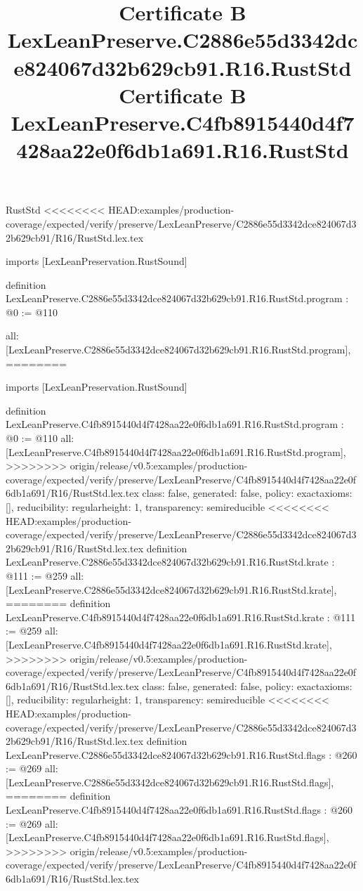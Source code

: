 \begin{lexlean}{RustStd}
<<<<<<<< HEAD:examples/production-coverage/expected/verify/preserve/LexLeanPreserve/C2886e55d3342dce824067d32b629cb91/R16/RustStd.lex.tex
\title{Certificate B LexLeanPreserve.C2886e55d3342dce824067d32b629cb91.R16.RustStd}
\begin{coremodule}
imports [LexLeanPreservation.RustSound]

definition LexLeanPreserve.C2886e55d3342dce824067d32b629cb91.R16.RustStd.program : @0 := @110 {
  all: [LexLeanPreserve.C2886e55d3342dce824067d32b629cb91.R16.RustStd.program],
========
\title{Certificate B LexLeanPreserve.C4fb8915440d4f7428aa22e0f6db1a691.R16.RustStd}
\begin{coremodule}
imports [LexLeanPreservation.RustSound]

definition LexLeanPreserve.C4fb8915440d4f7428aa22e0f6db1a691.R16.RustStd.program : @0 := @110 {
  all: [LexLeanPreserve.C4fb8915440d4f7428aa22e0f6db1a691.R16.RustStd.program],
>>>>>>>> origin/release/v0.5:examples/production-coverage/expected/verify/preserve/LexLeanPreserve/C4fb8915440d4f7428aa22e0f6db1a691/R16/RustStd.lex.tex
  class: false,
  generated: false,
  policy: exact{axioms: []},
  reducibility: regular{height: 1},
  transparency: semireducible
}
<<<<<<<< HEAD:examples/production-coverage/expected/verify/preserve/LexLeanPreserve/C2886e55d3342dce824067d32b629cb91/R16/RustStd.lex.tex
definition LexLeanPreserve.C2886e55d3342dce824067d32b629cb91.R16.RustStd.krate : @111 := @259 {
  all: [LexLeanPreserve.C2886e55d3342dce824067d32b629cb91.R16.RustStd.krate],
========
definition LexLeanPreserve.C4fb8915440d4f7428aa22e0f6db1a691.R16.RustStd.krate : @111 := @259 {
  all: [LexLeanPreserve.C4fb8915440d4f7428aa22e0f6db1a691.R16.RustStd.krate],
>>>>>>>> origin/release/v0.5:examples/production-coverage/expected/verify/preserve/LexLeanPreserve/C4fb8915440d4f7428aa22e0f6db1a691/R16/RustStd.lex.tex
  class: false,
  generated: false,
  policy: exact{axioms: []},
  reducibility: regular{height: 1},
  transparency: semireducible
}
<<<<<<<< HEAD:examples/production-coverage/expected/verify/preserve/LexLeanPreserve/C2886e55d3342dce824067d32b629cb91/R16/RustStd.lex.tex
definition LexLeanPreserve.C2886e55d3342dce824067d32b629cb91.R16.RustStd.flags : @260 := @269 {
  all: [LexLeanPreserve.C2886e55d3342dce824067d32b629cb91.R16.RustStd.flags],
========
definition LexLeanPreserve.C4fb8915440d4f7428aa22e0f6db1a691.R16.RustStd.flags : @260 := @269 {
  all: [LexLeanPreserve.C4fb8915440d4f7428aa22e0f6db1a691.R16.RustStd.flags],
>>>>>>>> origin/release/v0.5:examples/production-coverage/expected/verify/preserve/LexLeanPreserve/C4fb8915440d4f7428aa22e0f6db1a691/R16/RustStd.lex.tex
}}}
\end{coremodule}}
\end{coremodule}
\end{lexlean}
